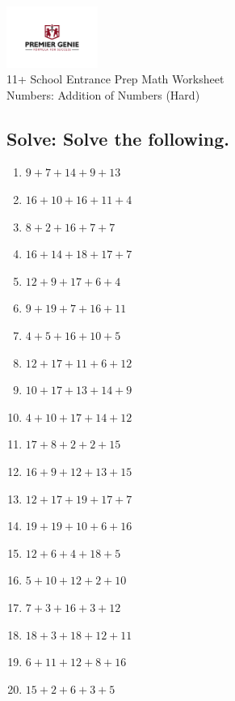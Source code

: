 \documentclass{article}
\begin{document}
\begin{center}
\includegraphics[width=3cm]{PREMGENIEJPG.jpg}\\
{\Large 11+ School Entrance Prep Math Worksheet}\\
{\Medium Numbers: Addition of Numbers (Hard)}\\

\end{center}

\subsection*{Solve: Solve the following.}

\begin{enumerate}
\item $\displaystyle {9}+{7}+{14}+{9}+{13} $ \ 
\item $\displaystyle {16}+{10}+{16}+{11}+{4} $ \ 
\item $\displaystyle {8}+{2}+{16}+{7}+{7} $ \ 
\item $\displaystyle {16}+{14}+{18}+{17}+{7} $ \ 
\item $\displaystyle {12}+{9}+{17}+{6}+{4} $ \ 
\item $\displaystyle {9}+{19}+{7}+{16}+{11} $ \ 
\item $\displaystyle {4}+{5}+{16}+{10}+{5} $ \ 
\item $\displaystyle {12}+{17}+{11}+{6}+{12} $ \ 
\item $\displaystyle {10}+{17}+{13}+{14}+{9} $ \ 
\item $\displaystyle {4}+{10}+{17}+{14}+{12} $ \ 
\item $\displaystyle {17}+{8}+{2}+{2}+{15} $ \ 
\item $\displaystyle {16}+{9}+{12}+{13}+{15} $ \ 
\item $\displaystyle {12}+{17}+{19}+{17}+{7} $ \ 
\item $\displaystyle {19}+{19}+{10}+{6}+{16} $ \ 
\item $\displaystyle {12}+{6}+{4}+{18}+{5} $ \ 
\item $\displaystyle {5}+{10}+{12}+{2}+{10} $ \ 
\item $\displaystyle {7}+{3}+{16}+{3}+{12} $ \ 
\item $\displaystyle {18}+{3}+{18}+{12}+{11} $ \ 
\item $\displaystyle {6}+{11}+{12}+{8}+{16} $ \ 
\item $\displaystyle {15}+{2}+{6}+{3}+{5} $ \ 


\end{enumerate}
\end{document}
